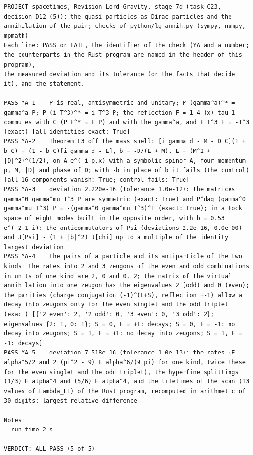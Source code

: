 \documentclass[
  10pt,
]{article}
\begin{document}
\begin{verbatim}
PROJECT spacetimes, Revision_Lord_Gravity, stage 7d (task C23, decision D12 (5)): the quasi-particles as Dirac particles and the annihilation of the pair; checks of python/lg_annih.py (sympy, numpy, mpmath)
Each line: PASS or FAIL, the identifier of the check (YA and a number; the counterparts in the Rust program are named in the header of this program),
the measured deviation and its tolerance (or the facts that decide it), and the statement.

PASS YA-1    P is real, antisymmetric and unitary; P (gamma^a)^* = gamma^a P; P (i T^3)^* = i T^3 P; the reflection F = 1_4 (x) tau_1 commutes with C (P F^* = F P) and with the gamma^a, and F T^3 F = -T^3 (exact) [all identities exact: True]
PASS YA-2    Theorem L3 off the mass shell: [i gamma d - M - D C](1 + b C) = (1 - b C)[i gamma d - E], b = -D/(E + M), E = (M^2 + |D|^2)^(1/2), on A e^(-i p.x) with a symbolic spinor A, four-momentum p, M, |D| and phase of D; with -b in place of b it fails (the control) [all 16 components vanish: True; control fails: True]
PASS YA-3    deviation 2.220e-16 (tolerance 1.0e-12): the matrices gamma^0 gamma^mu T^3 P are symmetric (exact: True) and P^dag (gamma^0 gamma^mu T^3) P = -(gamma^0 gamma^mu T^3)^T (exact: True); in a Fock space of eight modes built in the opposite order, with b = 0.53 e^(-2.1 i): the anticommutators of Psi (deviations 2.2e-16, 0.0e+00) and J[Psi] - (1 + |b|^2) J[chi] up to a multiple of the identity: largest deviation
PASS YA-4    the pairs of a particle and its antiparticle of the two kinds: the rates into 2 and 3 zeugons of the even and odd combinations in units of one kind are 2, 0 and 0, 2; the matrix of the virtual annihilation into one zeugon has the eigenvalues 2 (odd) and 0 (even); the parities (charge conjugation (-1)^(L+S), reflection +-1) allow a decay into zeugons only for the even singlet and the odd triplet (exact) [{'2 even': 2, '2 odd': 0, '3 even': 0, '3 odd': 2}; eigenvalues {2: 1, 0: 1}; S = 0, F = +1: decays; S = 0, F = -1: no decay into zeugons; S = 1, F = +1: no decay into zeugons; S = 1, F = -1: decays]
PASS YA-5    deviation 7.518e-16 (tolerance 1.0e-13): the rates (E alpha^5/2 and 2 (pi^2 - 9) E alpha^6/(9 pi) for one kind, twice these for the even singlet and the odd triplet), the hyperfine splittings (1/3) E alpha^4 and (5/6) E alpha^4, and the lifetimes of the scan (13 values of Lambda_LL) of the Rust program, recomputed in arithmetic of 30 digits: largest relative difference

Notes:
  run time 2 s

VERDICT: ALL PASS (5 of 5)
\end{verbatim}
\end{document}
